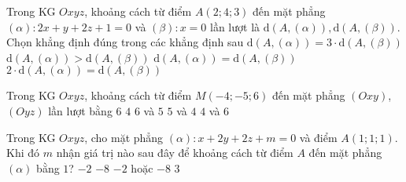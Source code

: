 \begin{ex} %
	Trong KG $Oxyz$, khoảng cách từ điểm $A(2;4;3)$ đến mặt phẳng $(\alpha)\colon 2x+y+2z+1=0$ và $(\beta)\colon x=0$ lần lượt là $\mathrm{d}(A,(\alpha)), \mathrm{d}(A,(\beta))$. Chọn khẳng định đúng trong các khẳng định sau
	\choice
	{$\mathrm{d}(A,(\alpha))=3\cdot \mathrm{d}(A,(\beta))$}
	{$\mathrm{d}(A,(\alpha))>\mathrm{d}(A,(\beta))$}
	{$\mathrm{d}(A,(\alpha))=\mathrm{d}(A,(\beta))$}
	{\True $2\cdot\mathrm{d}(A,(\alpha))=\mathrm{d}(A,(\beta))$}
\end{ex}
\begin{ex}%
	Trong KG $Oxyz$, khoảng cách từ điểm $M(-4;-5;6)$ đến mặt phẳng $(Oxy)$, $(Oyz)$ lần lượt bằng
	\choice
	{\True $6$  $4$}   
	{$6$ và $5$}
	{$5$ và $4$}
	{$4$ và $6$}
\end{ex}
\begin{ex}%
	Trong KG $Oxyz$, cho mặt phẳng $(\alpha)\colon x+2y+2z+m=0$ và điểm $A(1;1;1)$. Khi đó $m$ nhận giá trị nào sau đây để khoảng cách từ điểm $A$ đến mặt phẳng $(\alpha)$ bằng $1$?
	\choice
	{$-2$}
	{$-8$}
	{\True $-2$ hoặc $-8$}
	{$3$}
\end{ex}
